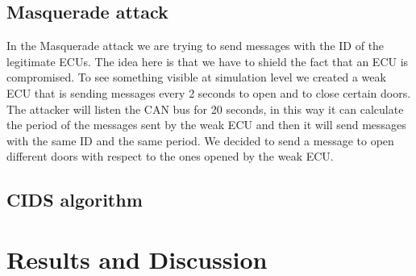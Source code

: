 \documentclass[12pt]{article}
\begin{document}
\subsection{Masquerade attack}
In the Masquerade attack we are trying to send messages with the ID of the legitimate ECUs. The idea here is that we have to shield the fact that an ECU is compromised. To see something visible at simulation level we created a weak ECU that is sending messages every 2 seconds to open and to close certain doors. The attacker will listen the CAN bus for 20 seconds, in this way it can calculate the period of the messages sent by the weak ECU and then it will send messages with the same ID and the same period. We decided to send a message to open different doors with respect to the ones opened by the weak ECU.
\subsection{CIDS algorithm}
\section{Results and Discussion}
\printbibliography 
\end{document}
